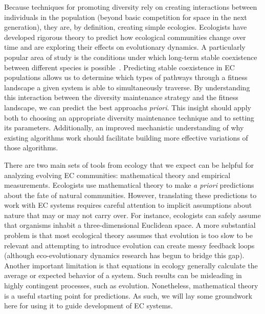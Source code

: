 Because techniques for promoting diversity rely on creating interactions between individuals in the population (beyond basic competition for space in the next generation), they are, by definition, creating simple ecologies. Ecologists have developed rigorous theory to predict how ecological communities change over time and are exploring their effects on evolutionary dynamics. A particularly popular area of study is the conditions under which long-term stable coexistence between different species is possible~\cite{pacala_limiting_1994, chesson_mechanisms_2000,chase_ecological_2003,letten_linking_2017}. Predicting stable coexistence in EC populations allows us to determine which types of pathways through a fitness landscape a given system is able to simultaneously traverse. By understanding this interaction between the diversity maintenance strategy and the fitness landscape, we can predict the best approach\textit{a priori}. This insight should apply both to choosing an appropriate diversity maintenance technique and to setting its parameters. Additionally, an improved mechanistic understanding of why existing algorithms work should facilitate building more effective variations of those algorithms.

There are two main sets of tools from ecology that we expect can be helpful for analyzing evolving EC communities: mathematical theory and empirical measurements. Ecologists use mathematical theory to make \textit{a priori} predictions about the fate of natural communities.  However, translating these predictions to work with EC systems requires careful attention to implicit assumptions about nature that may or may not carry over. For instance, ecologists can safely assume that organisms inhabit a three-dimensional Euclidean space. A more substantial problem is that most ecological theory assumes that evolution is too slow to be relevant and attempting to introduce evolution can create messy feedback loops (although eco-evolutionary dynamics research has begun to bridge this gap). Another important limitation is that equations in ecology generally calculate the average or expected behavior of a system. Such results can be misleading in highly contingent processes, such as evolution.
Nonetheless, mathematical theory is a useful starting point for predictions. As such, we will lay some groundwork here for using it to guide development of EC systems.

